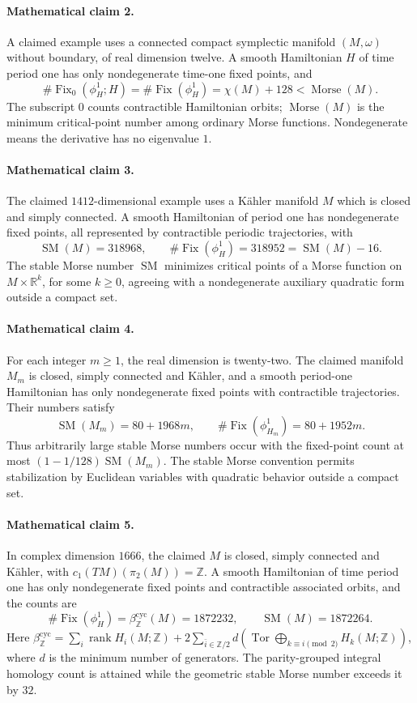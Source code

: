 \documentclass[11pt]{article}
\begin{document}
\paragraph{Mathematical claim 2.} A claimed example uses a connected compact symplectic manifold $(M,\omega)$ without boundary, of real dimension twelve. A smooth Hamiltonian $H$ of time period one has only nondegenerate time-one fixed points, and \[\#\operatorname{Fix}_0(\phi_H^1;H)=\#\operatorname{Fix}(\phi_H^1)=\chi(M)+128<\operatorname{Morse}(M).\] The subscript $0$ counts contractible Hamiltonian orbits; $\operatorname{Morse}(M)$ is the minimum critical-point number among ordinary Morse functions. Nondegenerate means the derivative has no eigenvalue $1$.

\paragraph{Mathematical claim 3.} The claimed $1412$-dimensional example uses a K\"ahler manifold $M$ which is closed and simply connected. A smooth Hamiltonian of period one has nondegenerate fixed points, all represented by contractible periodic trajectories, with \[\operatorname{SM}(M)=318968,\qquad\#\operatorname{Fix}(\phi_H^1)=318952=\operatorname{SM}(M)-16.\] The stable Morse number $\operatorname{SM}$ minimizes critical points of a Morse function on $M\times\mathbb R^k$, for some $k\ge0$, agreeing with a nondegenerate auxiliary quadratic form outside a compact set.

\paragraph{Mathematical claim 4.} For each integer $m\ge1$, the real dimension is twenty-two. The claimed manifold $M_m$ is closed, simply connected and K\"ahler, and a smooth period-one Hamiltonian has only nondegenerate fixed points with contractible trajectories. Their numbers satisfy \[\operatorname{SM}(M_m)=80+1968m,\qquad\#\operatorname{Fix}(\phi_{H_m}^1)=80+1952m.\] Thus arbitrarily large stable Morse numbers occur with the fixed-point count at most $(1-1/128)\operatorname{SM}(M_m)$. The stable Morse convention permits stabilization by Euclidean variables with quadratic behavior outside a compact set.

\paragraph{Mathematical claim 5.} In complex dimension $1666$, the claimed $M$ is closed, simply connected and K\"ahler, with $c_1(TM)(\pi_2(M))=\mathbb Z$. A smooth Hamiltonian of time period one has only nondegenerate fixed points and contractible associated orbits, and the counts are \[\#\operatorname{Fix}(\phi_H^1)=\beta_{\mathbb Z}^{\mathrm{cyc}}(M)=1872232,\qquad\operatorname{SM}(M)=1872264.\] Here $\beta_{\mathbb Z}^{\mathrm{cyc}}=\sum_i\operatorname{rank}H_i(M;\mathbb Z)+2\sum_{\bar i\in\mathbb Z/2}d(\operatorname{Tor}\bigoplus_{k\equiv i\pmod2}H_k(M;\mathbb Z))$, where $d$ is the minimum number of generators. The parity-grouped integral homology count is attained while the geometric stable Morse number exceeds it by $32$.
\end{document}

